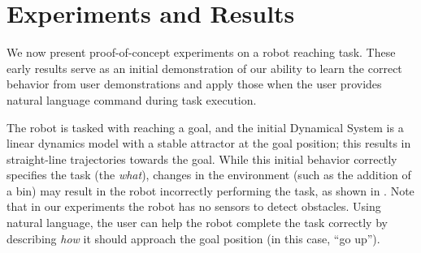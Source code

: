 \section{Experiments and Results}
\label{sec:results}

We now present proof-of-concept experiments on a robot reaching task.
These early results serve as an initial demonstration of our ability to learn the correct behavior from user demonstrations and apply those when the user provides natural language command during task execution.

The robot is tasked with reaching a goal, and the initial Dynamical System is a linear dynamics model with a stable attractor at the goal position; this results in straight-line trajectories towards the goal.
While this initial behavior correctly specifies the task (the \emph{what}), changes in the environment (such as the addition of a bin) may result in the robot incorrectly performing the task, as shown in . Note that in our experiments the robot has no sensors to detect obstacles.
Using natural language, the user can help the robot complete the task correctly by describing \emph{how} it should approach the goal position (in this case, ``go up'').


